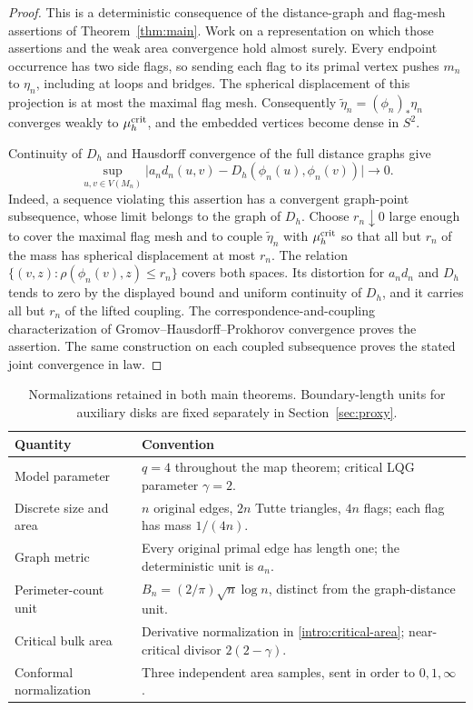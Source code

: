\begin{proof}
This is a deterministic consequence of the distance-graph and flag-mesh
assertions of Theorem~\ref{thm:main}. Work on a representation on which
those assertions and the weak area convergence hold almost surely.
Every endpoint occurrence has two side flags, so sending each flag to
its primal vertex pushes $m_n$ to $\eta_n$, including at loops and
bridges. The spherical displacement of this projection is at most the
maximal flag mesh. Consequently
$\widetilde\eta_n=(\phi_n)_*\eta_n$ converges weakly to
$\mu_h^{\rm crit}$, and the embedded vertices become dense in $S^2$.

Continuity of $D_h$ and Hausdorff convergence of the full distance graphs
give
\[
 \sup_{u,v\in V(M_n)}
 \bigl|a_nd_n(u,v)-D_h(\phi_n(u),\phi_n(v))\bigr|
 \longrightarrow0.
\]
Indeed, a sequence violating this assertion has a convergent graph-point
subsequence, whose limit belongs to the graph of $D_h$.
Choose $r_n\downarrow0$ large enough to cover the maximal flag mesh and
to couple $\widetilde\eta_n$ with $\mu_h^{\rm crit}$ so that all but
$r_n$ of the mass has spherical displacement at most $r_n$. The relation
$\{(v,z):\rho(\phi_n(v),z)\le r_n\}$ covers both spaces. Its distortion
for $a_nd_n$ and $D_h$ tends to zero by the displayed bound and uniform
continuity of $D_h$, and it carries all but $r_n$ of the lifted coupling.
The correspondence-and-coupling characterization of
Gromov--Hausdorff--Prokhorov convergence proves the assertion. The same
construction on each coupled subsequence proves the stated joint
convergence in law.
\end{proof}

\begin{table}[htbp]
\centering\small
\begin{tabular}{@{}p{}p{}@{}}
\toprule
Quantity & Convention \\
\midrule
Model parameter & $q=4$ throughout the map theorem; critical LQG parameter $\gamma=2$. \\[3pt]
Discrete size and area & $n$ original edges, $2n$ Tutte triangles, $4n$ flags; each flag has mass $1/(4n)$. \\[3pt]
Graph metric & Every original primal edge has length one; the deterministic unit is $a_n$. \\[3pt]
Perimeter-count unit & $B_n=(2/\pi)\sqrt n\log n$, distinct from the graph-distance unit. \\[3pt]
Critical bulk area & Derivative normalization in \eqref{intro:critical-area}; near-critical divisor $2(2-\gamma)$. \\[3pt]
Conformal normalization & Three independent area samples, sent in order to $0,1,\infty$. \\
\bottomrule
\end{tabular}
\caption{Normalizations retained in both main theorems.  Boundary-length units for auxiliary disks are fixed separately in Section~\ref{sec:proxy}.}
\label{tab:normalizations}
\end{table}

